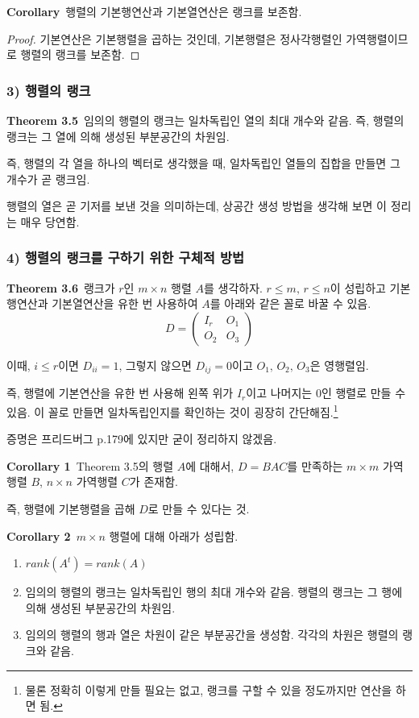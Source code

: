 \textbf{Corollary}\, 행렬의 기본행연산과 기본열연산은 랭크를 보존함.

\begin{proof}
기본연산은 기본행렬을 곱하는 것인데, 기본행렬은 정사각행렬인 가역행렬이므로 행렬의 랭크를 보존함.
\end{proof}

\subsubsection*{3) 행렬의 랭크}
\textbf{Theorem 3.5}\, 임의의 행렬의 랭크는 일차독립인 열의 최대 개수와 같음. 즉, 행렬의 랭크는 그 열에 의해 생성된 부분공간의 차원임.

즉, 행렬의 각 열을 하나의 벡터로 생각했을 때, 일차독립인 열들의 집합을 만들면 그 개수가 곧 랭크임.

행렬의 열은 곧 기저를 보낸 것을 의미하는데, 상공간 생성 방법을 생각해 보면 이 정리는 매우 당연함.


\subsubsection*{4) 행렬의 랭크를 구하기 위한 구체적 방법}
\textbf{Theorem 3.6}\, 랭크가 $r$인 $m \times n$ 행렬 $A$를 생각하자. $r \leq m,\,r \leq n$이 성립하고 기본행연산과 기본열연산을 유한 번 사용하여 $A$를 아래와 같은 꼴로 바꿀 수 있음.
\[
D=
\begin{pmatrix}
I_r & O_1\\
O_2 & O_3
\end{pmatrix}
\]

이때, $i \leq r$이면 $D_{ii}=1$, 그렇지 않으면 $D_{ij}=0$이고 $O_1,\,O_2,\,O_3$은 영행렬임.

즉, 행렬에 기본연산을 유한 번 사용해 왼쪽 위가 $I_r$이고 나머지는 0인 행렬로 만들 수 있음. 이 꼴로 만들면 일차독립인지를 확인하는 것이 굉장히 간단해짐.\footnote{물론 정확히 이렇게 만들 필요는 없고, 랭크를 구할 수 있을 정도까지만 연산을 하면 됨.}

증명은 프리드버그 p.179에 있지만 굳이 정리하지 않겠음.


\newpage


\textbf{Corollary 1}\, Theorem 3.5의 행렬 $A$에 대해서, $D=BAC$를 만족하는 $m \times m$ 가역행렬 $B$, $n \times n$ 가역행렬 $C$가 존재함.

즉, 행렬에 기본행렬을 곱해 $D$로 만들 수 있다는 것.

\textbf{Corollary 2}\, $m \times n$ 행렬에 대해 아래가 성립함.
\begin{enumerate}
    \item $rank(A^t)=rank(A)$
    \item 임의의 행렬의 랭크는 일차독립인 행의 최대 개수와 같음. 행렬의 랭크는 그 행에 의해 생성된 부분공간의 차원임.
    \item 임의의 행렬의 행과 열은 차원이 같은 부분공간을 생성함. 각각의 차원은 행렬의 랭크와 같음.
\end{enumerate}

